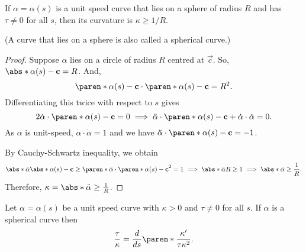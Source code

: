 \documentclass[11pt]{penrose}
\newcommand{\keyword}[1]{\textsf{#1}}
\begin{document}
\begin{nthm}
    If $\alpha = \alpha(s)$ is a unit speed curve that lies on a sphere of radius $R$ and has $\tau \neq 0$ for all $s$, then its curvature is $\kappa \geq 1/R$.
\end{nthm}
(A curve that lies on a sphere is also called a \keyword{spherical curve}.)
\begin{proof}
    Suppose $\alpha$ lies on a circle of radius $R$ centred at $\vec{c}$. So, $\abs*{\alpha(s) - \vec{c}} = R$. And,
    \begin{equation}
        \paren*{\alpha(s) - \vec{c}} \cdot \paren*{\alpha(s) - \vec{c}} = R^2.
    \end{equation}
    Differentiating this twice with respect to $s$ gives
    \begin{equation}
        2 \dot{\alpha} \cdot \paren*{\alpha(s) - \vec{c}} = 0
        \implies
        \ddot{\alpha} \cdot \paren*{\alpha(s) - \vec{c}} + \dot{\alpha} \cdot \dot{\alpha} = 0.
    \end{equation}
    As $\alpha$ is unit-speed, $\dot{\alpha} \cdot \dot{\alpha} = 1$ and we have $\ddot{\alpha} \cdot \paren*{\alpha(s) - \vec{c}} = -1$.

    By Cauchy-Schwartz inequality, we obtain
    \begin{equation}
        \abs*{\ddot{\alpha}} \abs*{\alpha(s) - \vec{c}}
        \geq \paren*{ \ddot{\alpha} \cdot \paren*{\alpha(s) - \vec{c}} }^2
        = 1
        \implies
        \abs*{\ddot{\alpha}} R
        \geq 1
        \implies
        \abs*{\ddot{\alpha}} \geq \frac{1}{R}.
    \end{equation}
    Therefore, $\kappa = \abs*{\ddot{\alpha}} \geq \frac{1}{R}$.
\end{proof}

\begin{nthm}
    Let $\alpha = \alpha(s)$ be a unit speed curve with $\kappa > 0$ and $\tau \neq 0$ for all $s$. If $\alpha$ is a spherical curve then
    \begin{equation}
        \frac{\tau}{\kappa} = \frac{d}{ds}\paren*{\frac{\kappa'}{\tau \kappa^2}}.
    \end{equation}
\end{nthm}
\end{document}

